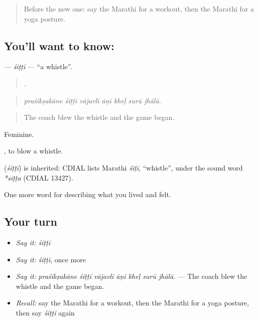 \label{lesson:MR-C533-sitti}



\begin{quote}
Before the new one: say the Marathi for a workout, then the Marathi for a yoga posture.
\end{quote}

\subsection*{You'll want to know: }
\textbf{} — \emph{śiṭṭī} — \textquotedblleft{}a whistle\textquotedblright{}.

\begin{quote}
      .
\end{quote}

\begin{quote}
\emph{praśikṣakāne śiṭṭī vājavlī āṇi kheḷ surū jhālā.}
\end{quote}

\begin{quote}
The coach blew the whistle and the game began.
\end{quote}

Feminine.

 , to blow a whistle.

\begin{cousinweb}
\textbf{} (\emph{śiṭṭī}) is inherited: CDIAL lists Marathi \emph{śiṭī}, \textquotedblleft{}whistle\textquotedblright{}, under the sound word \emph{*sīṭṭa} (CDIAL 13427).
\end{cousinweb}

\begin{grammarlens}[title={What you've built}]
One more word for describing what you lived and felt.
\end{grammarlens}

\subsection*{Your turn}
\begin{itemize}
\raggedright
  \item \emph{Say it:} \emph{śiṭṭī}
  \item \emph{Say it:} \emph{śiṭṭī}, once more
  \item \emph{Say it:} \emph{praśikṣakāne śiṭṭī vājavlī āṇi kheḷ surū jhālā.} — The coach blew the whistle and the game began.
  \item \emph{Recall:} say the Marathi for a workout, then the Marathi for a yoga posture, then say \emph{śiṭṭī} again
\end{itemize}

